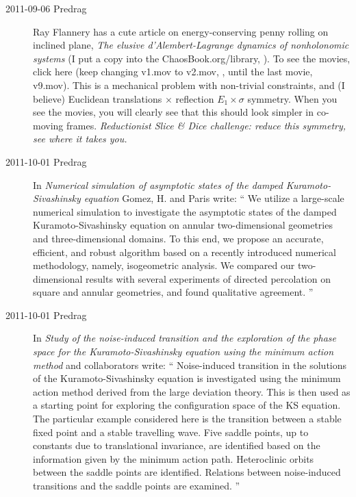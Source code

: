 \begin{description}
\item[2011-09-06 Predrag]
Ray Flannery
has a cute article on energy-\-conserving penny rolling on inclined
plane,
{\em The elusive {d'Alembert-Lagrange} dynamics of nonholonomic systems}
(I put a copy into the
ChaosBook.org/library,
).
To see the movies,
{click here}
(keep changing v1.mov to v2.mov, \etc, until the last movie,
{v9.mov}).
This is a mechanical problem with non-trivial constraints,
and (I believe) Euclidean translations $\times$ reflection
$E_1 \times \sigma$ symmetry. When you see the movies,
you will clearly see that this should look simpler in co-moving frames.
\emph{
Reductionist
Slice \& Dice challenge: reduce this symmetry, see where it takes you.
}

\item[2011-10-01 Predrag]
In {\em Numerical simulation of asymptotic states of the damped
            {Kuramoto-Sivashinsky} equation}
Gomez, H. and Paris write: ``
We utilize a large-scale numerical simulation to investigate the
asymptotic states of the damped Kuramoto-Sivashinsky equation on annular
two-dimensional geometries and three-dimensional domains. To this end, we
propose an accurate, efficient, and robust algorithm based on a recently
introduced numerical methodology, namely, isogeometric analysis. We
compared our two-dimensional results with several experiments of directed
percolation on square and annular geometries, and found qualitative
agreement.
''

\item[2011-10-01 Predrag]
In {\em Study of the noise-induced transition and the exploration of the
  phase space for the {Kuramoto-Sivashinsky} equation using the minimum
  action method}
 and
collaborators write: ``
Noise-induced transition in the solutions of the
  Kuramoto-Sivashinsky equation is investigated using the
  minimum action method derived from the large deviation theory. This is
  then used as a starting point for exploring the configuration space of
  the KS equation. The particular example considered here is the
  transition between a stable fixed point and a stable travelling wave.
  Five saddle points, up to constants due to translational invariance,
  are identified based on the information given by the minimum action
  path. Heteroclinic orbits between the saddle points are identified.
  Relations between noise-induced transitions and the saddle points are
  examined.
''


\end{description}
